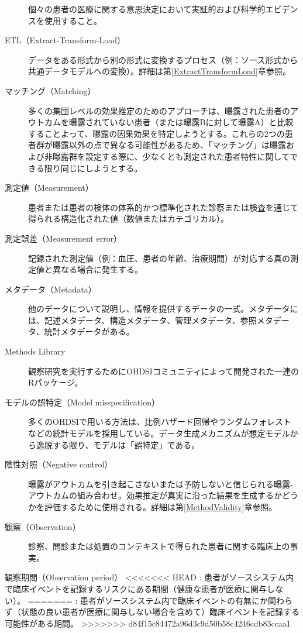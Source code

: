 \documentclass[
  11pt]{book}
\theoremstyle{definition}
\theoremstyle{definition}
\theoremstyle{definition}
\theoremstyle{definition}
\theoremstyle{remark}
\begin{document}
\begin{description}
個々の患者の医療に関する意思決定において実証的および科学的エビデンスを使用すること。
\item[ETL（Extract-Transform-Load）]
データをある形式から別の形式に変換するプロセス（例：ソース形式から共通データモデルへの変換）。詳細は第\ref{ExtractTransformLoad}章参照。
\item[マッチング（Matching）]
多くの集団レベルの効果推定のためのアプローチは、曝露された患者のアウトカムを曝露されていない患者（または曝露Bに対して曝露A）と比較することよって、曝露の因果効果を特定しようとする。これらの2つの患者群が曝露以外の点で異なる可能性があるため、「マッチング」は曝露および非曝露群を設定する際に、少なくとも測定された患者特性に関してできる限り同じにしようとする。
\item[測定値（Measurement）]
患者または患者の検体の体系的かつ標準化された診察または検査を通じて得られる構造化された値（数値またはカテゴリカル）。
\item[測定誤差（Measurement error）]
記録された測定値（例：血圧、患者の年齢、治療期間）が対応する真の測定値と異なる場合に発生する。
\item[メタデータ（Metadata）]
他のデータについて説明し、情報を提供するデータの一式。メタデータには、記述メタデータ、構造メタデータ、管理メタデータ、参照メタデータ、統計メタデータがある。
\item[Methods Library]
観察研究を実行するためにOHDSIコミュニティによって開発された一連のRパッケージ。
\item[モデルの誤特定（Model misspecification）]
多くのOHDSIで用いる方法は、比例ハザード回帰やランダムフォレストなどの統計モデルを採用している。データ生成メカニズムが想定モデルから逸脱する限り、モデルは「誤特定」である。
\item[陰性対照（Negative control）]
曝露がアウトカムを引き起こさないまたは予防しないと信じられる曝露-アウトカムの組み合わせ。効果推定が真実に沿った結果を生成するかどうかを評価するために使用される。詳細は第\ref{MethodValidity}章参照。
\item[観察（Observation）]
診察、問診または処置のコンテキストで得られた患者に関する臨床上の事実。
\end{description}

観察期間（Observation period）
\textless\textless\textless\textless\textless\textless\textless{} HEAD
: 患者がソースシステム内で臨床イベントを記録するリスクにある期間（健康な患者が医療に関与しない）。
=======
: 患者がソースシステム内で臨床イベントの有無にか関わらず（状態の良い患者が医療に関与しない場合を含めて）臨床イベントを記録する可能性がある期間。
\textgreater\textgreater\textgreater\textgreater\textgreater\textgreater\textgreater{} d84f15c84472a96d3c9d50b58c4246cdb83ccaa1
\end{document}
